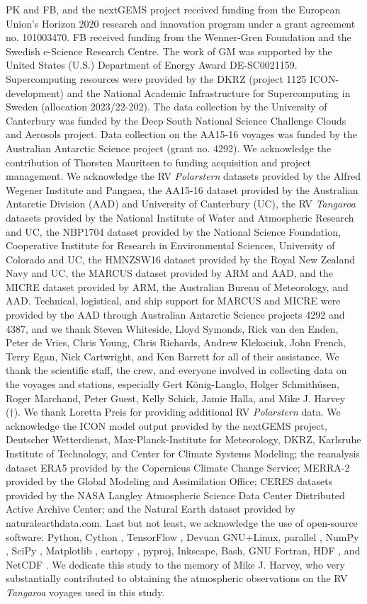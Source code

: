 \documentclass[draft]{agujournal2019}
\begin{document}
PK and FB, and the nextGEMS project received funding from the European Union’s Horizon 2020 research and innovation program under a grant agreement no. 101003470. FB received funding from the Wenner-Gren Foundation and the Swedish e-Science Research Centre. The work of GM was supported by the United States (U.S.) Department of Energy Award DE-SC0021159. Supercomputing resources were provided by the DKRZ (project 1125 ICON-development) and the National Academic Infrastructure for Supercomputing in Sweden (allocation 2023/22-202). The data collection by the University of Canterbury was funded by the Deep South National Science Challenge Clouds and Aerosols project. Data collection on the AA15-16 voyages was funded by the Australian Antarctic Science project (grant no. 4292). We acknowledge the contribution of Thorsten Mauritsen to funding acquisition and project management. We acknowledge the RV \emph{Polarstern} datasets provided by the Alfred Wegener Institute and Pangaea, the AA15-16 dataset provided by the Australian Antarctic Division (AAD) and University of Canterbury (UC), the RV \emph{Tangaroa} datasets provided by the National Institute of Water and Atmospheric Research and UC, the NBP1704 dataset provided by the National Science Foundation, Cooperative Institute for Research in Environmental Sciences, University of Colorado and UC, the HMNZSW16 dataset provided by the Royal New Zealand Navy and UC, the MARCUS dataset provided by ARM and AAD, and the MICRE dataset provided by ARM, the Australian Bureau of Meteorology, and AAD. Technical, logistical, and ship support for MARCUS and MICRE were provided by the AAD through Australian Antarctic Science projects 4292 and 4387, and we thank Steven Whiteside, Lloyd Symonds, Rick van den Enden, Peter de Vries, Chris Young, Chris Richards, Andrew Klekociuk, John French, Terry Egan, Nick Cartwright, and Ken Barrett for all of their assistance. We thank the scientific staff, the crew, and everyone involved in collecting data on the voyages and stations, especially Gert König-Langlo, Holger Schmithüsen, Roger Marchand, Peter Guest, Kelly Schick, Jamie Halla, and Mike J. Harvey (†). We thank Loretta Preis for providing additional RV \emph{Polarstern} data. We acknowledge the ICON model output provided by the nextGEMS project, Deutscher Wetterdienst, Max-Planck-Institute for Meteorology, DKRZ, Karlsruhe Institute of Technology, and Center for Climate Systems Modeling; the reanalysis dataset ERA5 provided by the Copernicus Climate Change Service; MERRA-2 provided by the Global Modeling and Assimilation Office; CERES datasets provided by the NASA Langley Atmospheric Science Data Center Distributed Active Archive Center; and the Natural Earth dataset provided by naturalearthdata.com. Last but not least, we acknowledge the use of open-source software: Python, Cython \cite{behnel2011}, TensorFlow \cite{abadi2016}, Devuan GNU+Linux, parallel \cite{tange2011}, NumPy \cite{harris2020}, SciPy \cite{virtanen2020}, Matplotlib \cite{hunter2007}, cartopy \cite{cartopy}, pyproj, Inkscape, Bash, GNU Fortran, HDF \cite{folk1999}, and NetCDF \cite{rew1990}. We dedicate this study to the memory of Mike J. Harvey, who very substantially contributed to obtaining the atmospheric observations on the RV \emph{Tangaroa} voyages used in this study.


\end{document}
